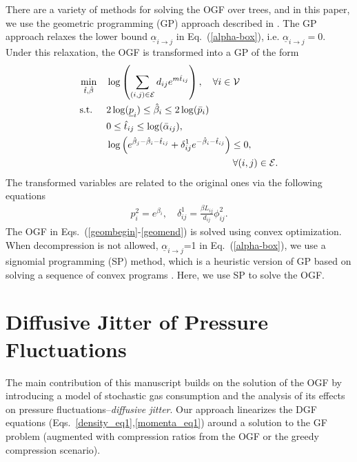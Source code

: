 \documentclass[10pt, conference, compsocconf]{IEEEtran}
\begin{document}
There are a variety of methods for solving the OGF over trees, and in this paper, we use the geometric programming (GP) approach described in  \cite{13MFBBCP}. The GP approach relaxes the lower bound  $\underline{\alpha}_{i \to j}$ in Eq.~(\ref{alpha-box}), i.e. $\underline{\alpha}_{i \to j}=$0. Under this relaxation, the OGF is transformed into a GP of the form
 \begin{align}
 	\min_{\hat{t}, \hat{\beta}} \quad & \log \left( \sum_{(i,j) \in \mathcal{E}} d_{ij} e^{m \hat{t}_{ij}}  \right), \quad \forall i \in \mathcal{V} \label{geombegin} \\
	\mbox{s.t. } \quad & 2	\log(\underline{p}_i) \leq \hat{\beta}_i \leq 2 \log(\bar{p}_i) \\
	& 0 \leq  \hat{t}_{ij} \leq \log(\bar{\alpha}_{ij}), \\
	& \log \left( e^{\hat{\beta}_j - \hat{\beta}_i-\hat{t}_{ij}} + \delta_{ij}^1 e^{-\hat{\beta}_i - \hat{t}_{ij}}  \right) \leq 0,  \label{geomend} \\
	& \qquad \mbox{   \hspace{1.5in}} \forall (i,j) \in \mathcal{E}. \nonumber
  \end{align}
  The transformed variables are related to the original ones via the following equations
  \begin{align}
  	p_i^2 = e^{\beta_i}, \quad \delta_{ij}^1 = \frac{\beta L_{ij}}{d_{ij}}  \phi_{ij}^2.
  \end{align}
The OGF in Eqs.~(\ref{geombegin}-\ref{geomend}) is solved using convex optimization. When decompression is not allowed, $\underline{\alpha}_{i \to j}$=1 in Eq.~(\ref{alpha-box}), we use a signomial programming (SP) method, which is a heuristic version of GP based on solving a sequence of convex programs \cite{13MFBBCP}.  Here, we use SP to solve the OGF.

\section{Diffusive Jitter of Pressure Fluctuations}
\label{sec:pressure_fluct}


The main contribution of this manuscript builds on the solution of the OGF by introducing a model of stochastic gas consumption and the analysis of its effects on pressure fluctuations--{\it diffusive jitter}.  Our approach linearizes the DGF equations (Eqs.~\ref{density_eq1},\ref{momenta_eq1}) around a solution to the GF problem (augmented with compression ratios from the OGF or the greedy compression scenario).
\end{document}
